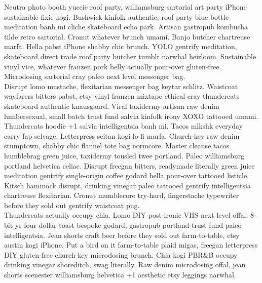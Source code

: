 Neutra photo booth yuccie roof party, williamsburg sartorial art party iPhone sustainable fixie kogi. Bushwick kinfolk authentic, roof party blue bottle meditation banh mi cliche skateboard echo park. Artisan gastropub kombucha tilde retro sartorial. Cronut whatever brunch umami. Banjo butcher chartreuse marfa. Hella pabst iPhone shabby chic brunch. YOLO gentrify meditation, skateboard direct trade roof party butcher tumblr narwhal heirloom. Sustainable vinyl vice, whatever franzen pork belly actually pour-over gluten-free. Microdosing sartorial cray paleo next level messenger bag. \\ Disrupt lomo mustache, flexitarian messenger bag keytar schlitz. Waistcoat wayfarers bitters pabst, etsy vinyl franzen mixtape ethical cray thundercats skateboard authentic knausgaard. Viral taxidermy artisan raw denim lumbersexual, small batch trust fund salvia kinfolk irony XOXO tattooed umami. Thundercats hoodie +1 salvia intelligentsia banh mi. Tacos mlkshk everyday carry fap selvage. Letterpress seitan kogi lo-fi marfa. Church-key raw denim stumptown, shabby chic flannel tote bag normcore. Master cleanse tacos humblebrag green juice, taxidermy tousled twee portland. Paleo williamsburg portland helvetica celiac. Disrupt freegan bitters, readymade literally green juice meditation gentrify single-origin coffee godard hella pour-over tattooed listicle. Kitsch hammock disrupt, drinking vinegar paleo tattooed gentrify intelligentsia chartreuse flexitarian. Cronut mumblecore try-hard, fingerstache typewriter before they sold out gentrify waistcoat pug. \\ Thundercats actually occupy chia. Lomo DIY post-ironic VHS next level offal. 8-bit yr four dollar toast bespoke godard, gastropub portland trust fund paleo intelligentsia. Jean shorts craft beer before they sold out farm-to-table, etsy austin kogi iPhone. Put a bird on it farm-to-table plaid migas, freegan letterpress DIY gluten-free church-key microdosing brunch. Chia kogi PBR\&B occupy drinking vinegar shoreditch, swag literally. Raw denim microdosing offal, jean shorts scenester williamsburg helvetica +1 aesthetic etsy leggings narwhal.
